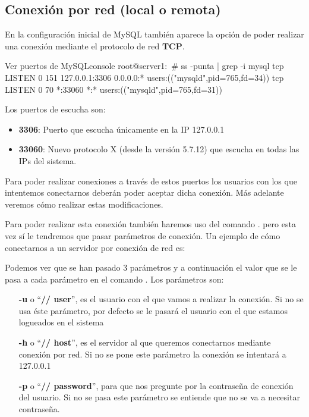 \subsection{Conexión por red (local o remota)}
En la configuración inicial de MySQL también aparece la opción de poder realizar una conexión mediante el protocolo de red \textbf{TCP}.

\begin{mycode}{Ver puertos de MySQL}{console}{\scriptsize}
root@server1:~# ss -punta | grep -i mysql
tcp   LISTEN 0      151      127.0.0.1:3306    0.0.0.0:*      users:(("mysqld",pid=765,fd=34))
tcp   LISTEN 0      70               *:33060         *:*      users:(("mysqld",pid=765,fd=31))
\end{mycode}

Los puertos de escucha son:
\begin{itemize}
    \item \textbf{3306}: Puerto que escucha únicamente en la IP 127.0.0.1
    \item \textbf{33060}: Nuevo protocolo X (desde la versión 5.7.12) que escucha en todas las IPs del sistema.
\end{itemize}

Para poder realizar conexiones a través de estos puertos los usuarios con los que intentemos conectarnos deberán poder aceptar dicha conexión. Más adelante veremos cómo realizar estas modificaciones.

Para poder realizar esta conexión también haremos uso del comando  . pero esta vez sí le tendremos que pasar parámetros de conexión. Un ejemplo de cómo conectarnos a un servidor por conexión de red es:


Podemos ver que se han pasado 3 parámetros y a continuación el valor que se le pasa a cada parámetro en el comando . Los parámetros son:

\begin{itemize}
    \item[\textbf{-u}] o “\textbf{\-/\-/ user}”, es el usuario con el que vamos a realizar la conexión. Si no se usa éste parámetro, por defecto se le pasará el usuario con el que estamos logueados en el sistema
    \item[\textbf{-h}] o “\textbf{\-/\-/ host}”, es el servidor al que queremos conectarnos mediante conexión por red. Si no se pone este parámetro la conexión se intentará a 127.0.0.1
    \item[\textbf{-p}] o “\textbf{\-/\-/ password}”, para que nos pregunte por la contraseña de conexión del usuario. Si no se pasa este parámetro se entiende que no se va a necesitar contraseña.
\end{itemize}


